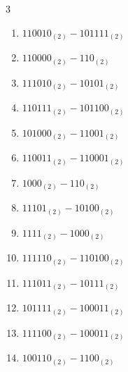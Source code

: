 \begin{multicols}{3}
\begin{enumerate}
  \item $110010_{(2)} - 101111_{(2)}$


  \item $110000_{(2)} - 110_{(2)}$


  \item $111010_{(2)} - 10101_{(2)}$


  \item $110111_{(2)} - 101100_{(2)}$


  \item $101000_{(2)} - 11001_{(2)}$


  \item $110011_{(2)} - 110001_{(2)}$


  \item $1000_{(2)} - 110_{(2)}$


  \item $11101_{(2)} - 10100_{(2)}$


\columnbreak %

  \item $1111_{(2)} - 1000_{(2)}$


  \item $111110_{(2)} - 110100_{(2)}$


  \item $111011_{(2)} - 10111_{(2)}$


  \item $101111_{(2)} - 100011_{(2)}$


  \item $111100_{(2)} - 100011_{(2)}$


  \item $100110_{(2)} - 1100_{(2)}$


\end{enumerate}
\end{multicols}
